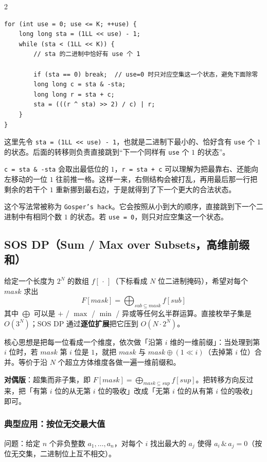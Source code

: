 \begin{multicols*}{2}
		\begin{verbatim}
for (int use = 0; use <= K; ++use) {
	long long sta = (1LL << use) - 1;
	while (sta < (1LL << K)) {
		// sta 的二进制中恰好有 use 个 1

		if (sta == 0) break;  // use=0 时只对应空集这一个状态，避免下面除零
		long long c = sta & -sta;
		long long r = sta + c;
		sta = (((r ^ sta) >> 2) / c) | r;
	}
}
		\end{verbatim}

		这里先令 \texttt{sta = (1LL << use) - 1}，也就是二进制下最小的、恰好含有 \texttt{use} 个 $1$ 的状态。后面的转移则负责直接跳到“下一个同样有 \texttt{use} 个 $1$ 的状态”。

		\texttt{c = sta \& -sta} 会取出最低位的 $1$，\texttt{r = sta + c} 可以理解为把最靠右、还能向左移动的一位 $1$ 往前推一格。这样一来，右侧结构会被打乱，再用最后那一行把剩余的若干个 $1$ 重新挪到最右边，于是就得到了下一个更大的合法状态。

		这个写法常被称为 \texttt{Gosper's hack}。它会按照从小到大的顺序，直接跳到下一个二进制中有相同个数 $1$ 的状态。若 \texttt{use = 0}，则只对应空集这一个状态。

		\subsection{SOS DP（Sum / Max over Subsets，高维前缀和）}

		给定一个长度为 $2^N$ 的数组 $f[\,\cdot\,]$（下标看成 $N$ 位二进制掩码），希望对每个 $mask$ 求出
		$$F[mask] = \bigoplus_{sub \subseteq mask} f[sub]$$
		其中 $\bigoplus$ 可以是 $+$ / $\max$ / $\min$ / 异或等任何幺半群运算。直接枚举子集是 $O(3^N)$；SOS DP 通过\textbf{逐位扩展}把它压到 $O(N \cdot 2^N)$。

		核心思想是把每一位看成一个维度，依次做「沿第 $i$ 维的一维前缀」：当处理到第 $i$ 位时，若 $mask$ 第 $i$ 位是 $1$，就把 $mask$ 与 $mask \oplus (1 \!\ll\! i)$（去掉第 $i$ 位）合并。等价于沿 $N$ 个超立方体维度各做一遍一维前缀和。

		\textbf{对偶版}：超集而非子集，即 $F[mask] = \bigoplus_{mask \subseteq sup} f[sup]$。把转移方向反过来，把「有第 $i$ 位的从无第 $i$ 位的吸收」改成「无第 $i$ 位的从有第 $i$ 位的吸收」即可。

		\subsubsection{典型应用：按位无交最大值}

		问题：给定 $n$ 个非负整数 $a_1, \dots, a_n$，对每个 $i$ 找出最大的 $a_j$ 使得 $a_i \,\&\, a_j = 0$（按位无交集，二进制位上互不相交）。


\end{multicols*}
